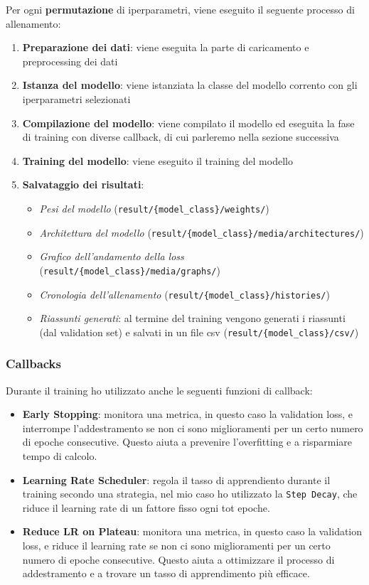 Per ogni \textbf{permutazione} di iperparametri, viene eseguito il seguente processo di allenamento:
\begin{enumerate}
    \item \textbf{Preparazione dei dati}: viene eseguita la parte di caricamento e preprocessing dei dati
    \item \textbf{Istanza del modello}: viene istanziata la classe del modello corrento con gli iperparametri selezionati
    \item \textbf{Compilazione del modello}: viene compilato il modello ed eseguita la fase di training con diverse callback, di cui parleremo nella sezione successiva
    \item \textbf{Training del modello}: viene eseguito il training del modello 
    \item \textbf{Salvataggio dei risultati}:
    \begin{itemize}
        \item \textit{Pesi del modello} (\texttt{result/\{model\_class\}/weights/})
        \item \textit{Architettura del modello} (\texttt{result/\{model\_class\}/media/architectures/})
        \item \textit{Grafico dell'andamento della loss} (\texttt{result/\{model\_class\}/media/graphs/})
        \item \textit{Cronologia dell'allenamento} (\texttt{result/\{model\_class\}/histories/})
        \item \textit{Riassunti generati}: al termine del training vengono generati i riassunti (dal validation set) e salvati in un file csv (\texttt{result/\{model\_class\}/csv/})
    \end{itemize}
\end{enumerate}

\subsubsection{Callbacks}
Durante il training ho utilizzato anche le seguenti funzioni di callback:
\begin{itemize}
    \item \textbf{Early Stopping}: monitora una metrica, in questo caso la validation loss, e interrompe l'addestramento se non ci sono miglioramenti per un certo numero di epoche consecutive. Questo aiuta a prevenire l'overfitting e a risparmiare tempo di calcolo.
    \item \textbf{Learning Rate Scheduler}: regola il tasso di apprendiento durante il training secondo una strategia, nel mio caso ho utilizzato la \texttt{Step Decay}, che riduce il learning rate di un fattore fisso ogni tot epoche.
    \item \textbf{Reduce LR on Plateau}: monitora una metrica, in questo caso la validation loss, e riduce il learning rate se non ci sono miglioramenti per un certo numero di epoche consecutive. Questo aiuta a ottimizzare il processo di addestramento e a trovare un tasso di apprendimento più efficace.
\end{itemize}

